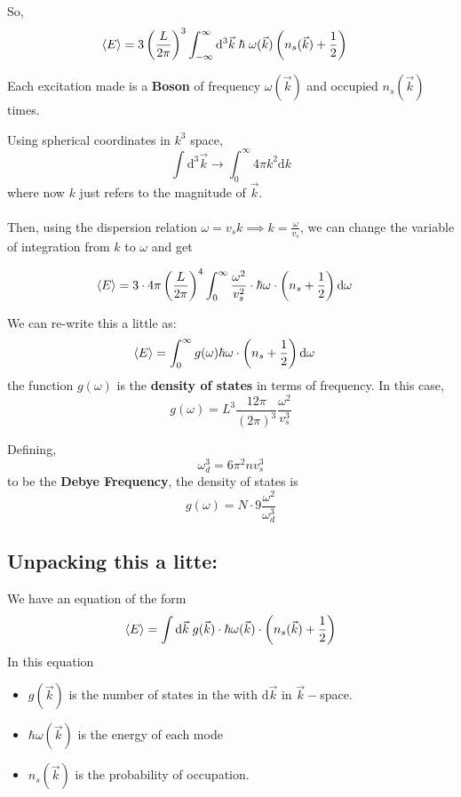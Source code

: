 \documentclass[11pt]{article}
\begin{document}
So,
\begin{align*}
  \langle E \rangle &= 3 \left(\frac{L}{2\pi}\right)^3 \int_{-\infty}^{\infty} \mathrm{d}^3\vec{k} \;\hbar \;\omega(\vec{k}) \left( n_s(\vec{k}) + \frac{1}{2} \right)
\end{align*}

Each excitation made is a \textbf{Boson} of frequency $\omega(\vec{k})$ and occupied $n_s(\vec{k})$ times.

Using spherical coordinates in $k^3$ space, 
\[ \int \mathrm{d}^3 \vec{k} \rightarrow \int_{0}^{\infty} 4\pi k^2 \mathrm{d}k \]
where now $k$ just refers to the magnitude of $\vec{k}$.
\\
\\
Then, using the dispersion relation $\omega = v_sk \implies k = \frac{\omega}{v_s}$, we can change the variable of integration from $k$ to $\omega$ and get

\begin{align*}
  \langle E \rangle &= 3 \cdot 4\pi \left(\frac{L}{2\pi}\right)^4 \int_{0}^{\infty} \frac{\omega^2}{v_s^2} \cdot \hbar \omega \cdot \left( n_s + \frac{1}{2} \right) \mathrm{d} \omega
\end{align*}

We can re-write this a little as:
\begin{align*}
  \langle E \rangle &= \int_{0}^{\infty} g(\omega) \hbar \omega \cdot \left( n_s + \frac{1}{2} \right) \mathrm{d}\omega
\end{align*}
the function $g(\omega)$ is the \textbf{density of states} in terms of frequency. In this case,
\[ g(\omega) = L^3 \frac{12 \pi}{(2\pi)^3} \frac{\omega^2}{v_s^3} \]

Defining, \[ \boxed{\omega_d^3 = 6\pi^2 n v_s^3 } \] to be the \textbf{Debye Frequency}, the density of states is 
\[ g(\omega) = N \cdot 9 \frac{\omega^2}{\omega_d^3} \]

\subsection*{Unpacking this a litte:}
We have an equation of the form 
\[ \langle E \rangle = \int \mathrm{d}\vec{k}\; g(\vec{k}) \cdot \hbar \omega(\vec{k}) \cdot \left(n_s(\vec{k}) + \frac{1}{2}\right) \] In this equation 
\begin{itemize}
  \item $g(\vec{k})$ is the number of states in the with $\mathrm{d}\vec{k}$ in $\vec{k}-$space.
  \item $\hbar \omega(\vec{k})$ is the energy of each mode
  \item $n_s(\vec{k})$ is the probability of occupation.
\end{itemize}
\end{document}
